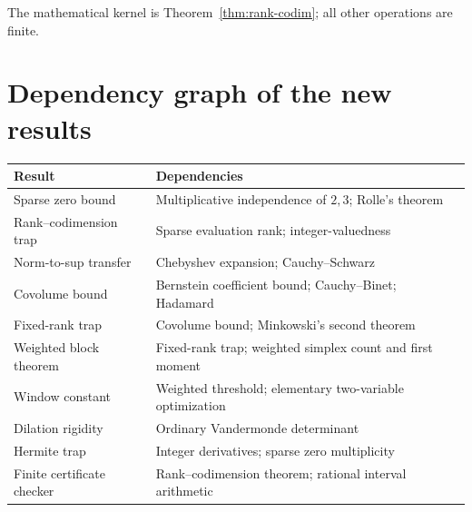\documentclass[11pt,oneside]{article}
\theoremstyle{definition}
\theoremstyle{remark}
\begin{document}
The mathematical kernel is Theorem~\ref{thm:rank-codim}; all other operations are finite.

\section{Dependency graph of the new results}
\label{app:dependency}

\begin{center}
\begin{tabularx}{0.96\textwidth}{@{}p{}X@{}}
\toprule
Result & Dependencies \\
\midrule
Sparse zero bound & Multiplicative independence of $2,3$; Rolle's theorem \\
Rank--codimension trap & Sparse evaluation rank; integer-valuedness \\
Norm-to-sup transfer & Chebyshev expansion; Cauchy--Schwarz \\
Covolume bound & Bernstein coefficient bound; Cauchy--Binet; Hadamard \\
Fixed-rank trap & Covolume bound; Minkowski's second theorem \\
Weighted block theorem & Fixed-rank trap; weighted simplex count and first moment \\
Window constant & Weighted threshold; elementary two-variable optimization \\
Dilation rigidity & Ordinary Vandermonde determinant \\
Hermite trap & Integer derivatives; sparse zero multiplicity \\
Finite certificate checker & Rank--codimension theorem; rational interval arithmetic \\
\bottomrule
\end{tabularx}
\end{center}
\end{document}
